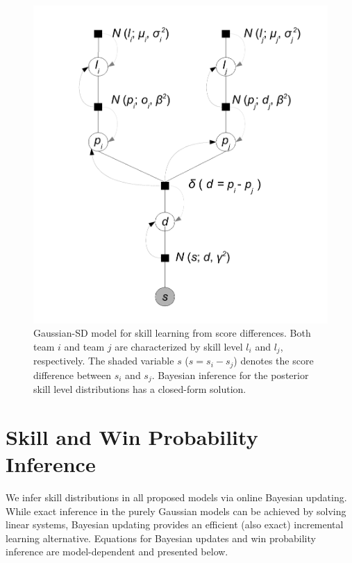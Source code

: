 \documentclass[runningheads,a4paper]{llncs}
\begin{document}
\begin{figure}
\vspace{-0.5cm}
\centerline{\includegraphics[scale=0.275]{modelAndInferenceGaussianGraphicalModelScoreDifference}}
\vspace{-3mm}
\caption{\small
Gaussian-SD model for skill learning from score differences.  Both team
$i$ and team $j$ are characterized by skill level $l_i$ and $l_j$,
respectively. The shaded variable $s$ ($s=s_i-s_j$) denotes the score
difference between $s_i$ and $s_j$. Bayesian inference for the posterior
skill level distributions has a closed-form solution.}
\label{fig:modelAndInferenceGaussianGraphicalModelScoreDifference}
\vspace{-2mm}
\end{figure}

\section{Skill and Win Probability Inference}

\label{sec:inference}

We infer skill distributions in all proposed models via
online Bayesian updating.  While exact inference in the purely Gaussian
models can be achieved by solving linear systems, Bayesian
updating provides an efficient (also exact) incremental learning alternative.
Equations for Bayesian updates and win probability inference are
model-dependent and presented below.
\end{document}
